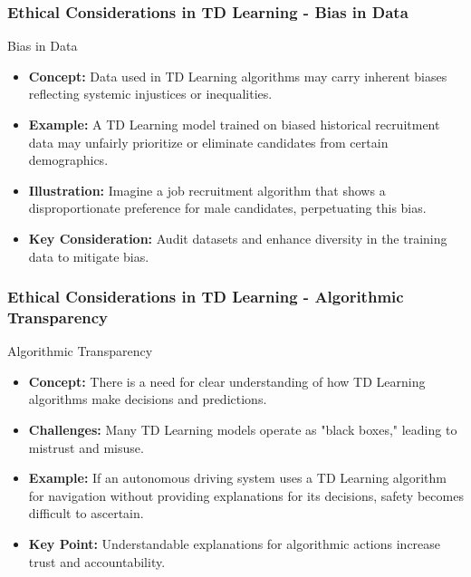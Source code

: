 \documentclass[aspectratio=169]{beamer}
\begin{document}
\begin{frame}[fragile]
    \frametitle{Ethical Considerations in TD Learning - Bias in Data}
    \begin{block}{Bias in Data}
        \begin{itemize}
            \item \textbf{Concept:} Data used in TD Learning algorithms may carry inherent biases reflecting systemic injustices or inequalities.
            \item \textbf{Example:} A TD Learning model trained on biased historical recruitment data may unfairly prioritize or eliminate candidates from certain demographics.
            \item \textbf{Illustration:} Imagine a job recruitment algorithm that shows a disproportionate preference for male candidates, perpetuating this bias.
            \item \textbf{Key Consideration:} Audit datasets and enhance diversity in the training data to mitigate bias.
        \end{itemize}
    \end{block}
\end{frame}

\begin{frame}[fragile]
    \frametitle{Ethical Considerations in TD Learning - Algorithmic Transparency}
    \begin{block}{Algorithmic Transparency}
        \begin{itemize}
            \item \textbf{Concept:} There is a need for clear understanding of how TD Learning algorithms make decisions and predictions.
            \item \textbf{Challenges:} Many TD Learning models operate as "black boxes," leading to mistrust and misuse.
            \item \textbf{Example:} If an autonomous driving system uses a TD Learning algorithm for navigation without providing explanations for its decisions, safety becomes difficult to ascertain.
            \item \textbf{Key Point:} Understandable explanations for algorithmic actions increase trust and accountability.
        \end{itemize}
    \end{block}
\end{frame}
\end{document}
